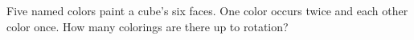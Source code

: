 Five named colors paint a cube's six faces. One color occurs twice and each other color once. How many colorings are there up to rotation?
